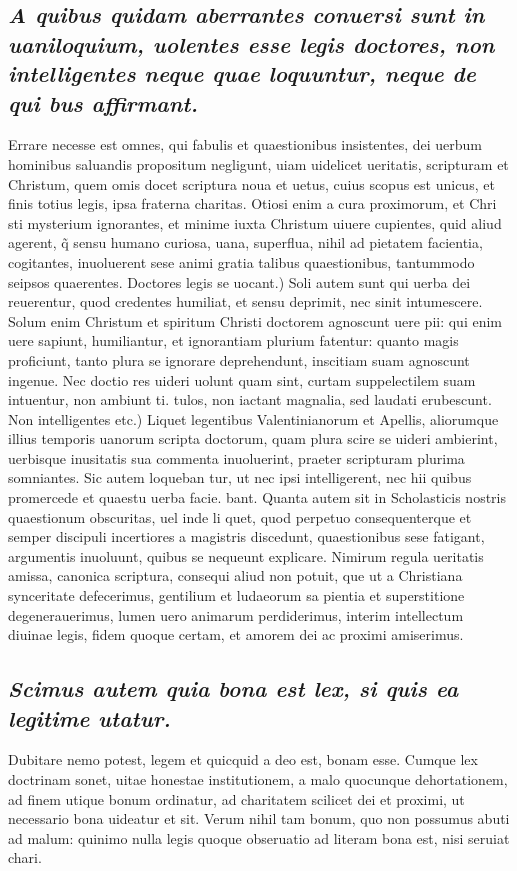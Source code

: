 \documentclass{article}
\begin{document}
\begin{pages}
\subsection*{\textit{A quibus quidam aberrantes conuersi sunt in uaniloquium, uolentes esse legis doctores, non intelligentes neque quae loquuntur, neque de qui bus affirmant. }}\pstart Errare necesse est omnes, qui fabulis et quaestionibus insistentes, dei uerbum hominibus saluandis propositum negligunt, uiam uidelicet ueritatis, scripturam et Christum, quem omis docet scriptura noua et uetus, cuius scopus est unicus, et finis totius legis, ipsa fraterna charitas. Otiosi enim a cura proximorum, et Chri sti mysterium ignorantes, et minime iuxta Christum uiuere cupientes, quid aliud agerent, q̃ sensu humano curiosa, uana, superflua, nihil ad pietatem facientia, cogitantes, inuoluerent sese animi gratia talibus quaestionibus, tantummodo seipsos quaerentes. Doctores legis se uocant.) Soli autem sunt qui uerba dei reuerentur, quod credentes humiliat, et sensu deprimit, nec sinit intumescere. Solum enim Christum et spiritum Christi doctorem agnoscunt uere pii: qui enim uere sapiunt, humiliantur, et ignorantiam plurium fatentur: quanto magis proficiunt, tanto plura se ignorare deprehendunt, inscitiam suam agnoscunt ingenue. Nec doctio res uideri uolunt quam sint, curtam suppelectilem suam intuentur, non ambiunt ti. tulos, non iactant magnalia, sed laudati erubescunt. Non intelligentes etc.) Liquet legentibus Valentinianorum et Apellis, aliorumque illius temporis uanorum scripta doctorum, quam plura scire se uideri ambierint, uerbisque inusitatis sua commenta inuoluerint, praeter scripturam plurima somniantes. Sic autem loqueban tur, ut nec ipsi intelligerent, nec hii quibus promercede et quaestu uerba facie. bant. Quanta autem sit in Scholasticis nostris quaestionum obscuritas, uel inde li quet, quod perpetuo consequenterque et semper discipuli incertiores a magistris discedunt, quaestionibus sese fatigant, argumentis inuoluunt, quibus se nequeunt explicare. Nimirum regula ueritatis amissa, canonica scriptura, consequi aliud non potuit, que ut a Christiana synceritate defecerimus, gentilium et ludaeorum sa pientia et superstitione degenerauerimus, lumen uero animarum perdiderimus, interim intellectum diuinae legis, fidem quoque certam, et amorem dei ac proximi amiserimus.  \pend
{}
{}
\subsection*{\textit{Scimus autem quia bona est lex, si quis ea legitime utatur. }}\pstart Dubitare nemo potest, legem et quicquid a deo est, bonam esse. Cumque lex doctrinam sonet, uitae honestae institutionem, a malo quocunque dehortationem, ad finem utique bonum ordinatur, ad charitatem scilicet dei et proximi, ut necessario bona uideatur et sit. Verum nihil tam bonum, quo non possumus abuti ad malum: quinimo nulla legis quoque obseruatio ad literam bona est, nisi seruiat chari.  \pend

\end{pages}
\end{document}
